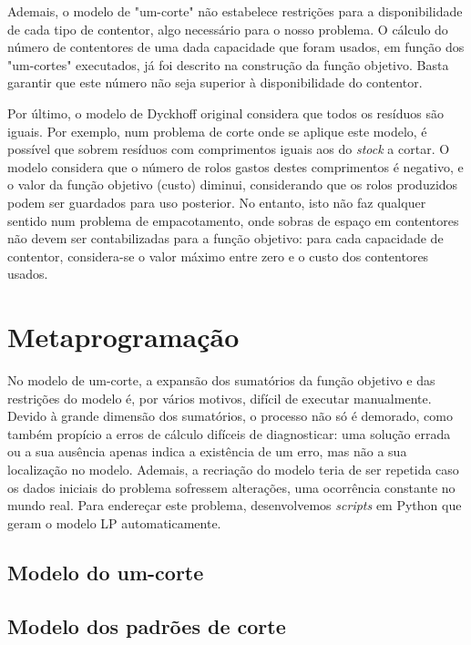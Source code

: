 \documentclass[12pt, a4paper, titlepage]{article}
\begin{document}
Ademais, o modelo de "um-corte"{} não estabelece restrições para a disponibilidade de cada tipo de
contentor, algo necessário para o nosso problema. O cálculo do número de contentores de uma dada
capacidade que foram usados, em função dos "um-cortes"{} executados, já foi descrito na construção
da função objetivo. Basta garantir que este número não seja superior à disponibilidade do contentor.

Por último, o modelo de Dyckhoff original considera que todos os resíduos são iguais. Por exemplo,
num problema de corte onde se aplique este modelo, é possível que sobrem resíduos com comprimentos
iguais aos do \emph{stock} a cortar. O modelo considera que o número de rolos gastos destes
comprimentos é negativo, e o valor da função objetivo (custo) diminui, considerando que os rolos
produzidos podem ser guardados para uso posterior. No entanto, isto não faz qualquer sentido num
problema de empacotamento, onde sobras de espaço em contentores não devem ser contabilizadas para a
função objetivo: para cada capacidade de contentor, considera-se o valor máximo entre zero e o custo
dos contentores usados.

\section{Metaprogramação}

No modelo de um-corte, a expansão dos sumatórios da função objetivo e das restrições do modelo é,
por vários motivos, difícil de executar manualmente. Devido à grande dimensão dos sumatórios, o
processo não só é demorado, como também propício a erros de cálculo difíceis de diagnosticar: uma
solução errada ou a sua ausência apenas indica a existência de um erro, mas não a sua localização
no modelo. Ademais, a recriação do modelo teria de ser repetida caso os dados iniciais do problema
sofressem alterações, uma ocorrência constante no mundo real. Para endereçar este problema,
desenvolvemos \emph{scripts} em Python que geram o modelo LP automaticamente.

\subsection{Modelo do um-corte}


\subsection{Modelo dos padrões de corte}
\end{document}
